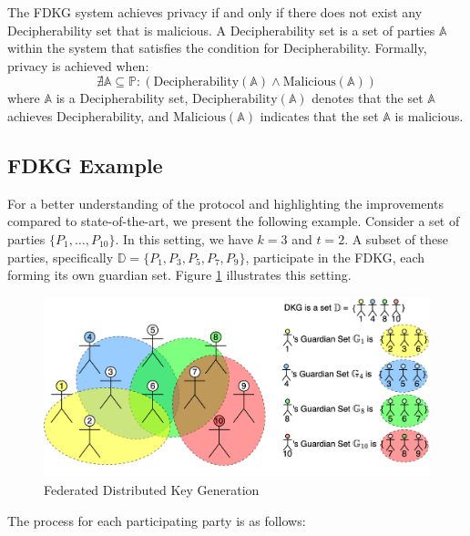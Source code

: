 \documentclass[runningheads]{llncs}
\begin{document}
\begin{definition}[Privacy] \label{def:privacy}
    The FDKG system achieves privacy if and only if there does not exist any Decipherability set that is malicious. A Decipherability set is a set of parties \( \mathbb{A} \) within the system that satisfies the condition for Decipherability. Formally, privacy is achieved when:
    \[
    \nexists \mathbb{A} \subseteq \mathbb{P} : (\text{Decipherability}(\mathbb{A}) \land \text{Malicious}(\mathbb{A}))
    \]
    where \( \mathbb{A} \) is a Decipherability set, \( \text{Decipherability}(\mathbb{A}) \) denotes that the set \( \mathbb{A} \) achieves Decipherability, and \( \text{Malicious}(\mathbb{A}) \) indicates that the set \( \mathbb{A} \) is malicious.
\end{definition}


\subsection{FDKG Example}

For a better understanding of the protocol and highlighting the improvements compared to state-of-the-art, we present the following example. Consider a set of parties $\{P_1, \ldots, P_{10}\}$. In this setting, we have $k = 3$ and $t = 2$. A subset of these parties, specifically $\mathbb{D} = \{P_1, P_3, P_5, P_7, P_9\}$, participate in the FDKG, each forming its own guardian set. Figure \ref{fig:FDKG} illustrates this setting.

\begin{figure}
    \centering
    \includegraphics[width=\textwidth]{FDKG.png}
    \caption{Federated Distributed Key Generation}
    \label{fig:FDKG}
\end{figure}

The process for each participating party is as follows:
\end{document}
